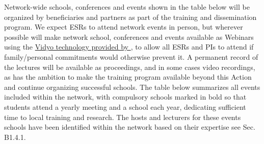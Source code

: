 
Network-wide schools, conferences and events shown in the table below will be organized by \acronym beneficiaries and partners as part of the training and dissemination program. 
We expect ESRs to attend network events in person, but wherever possible will make network school, conferences and events available as Webinars using the \href{http://information-technology.web.cern.ch/services/fe/vidyo}{Vidyo technology provided by \cernentity}, to allow all \acronym ESRs and PIs to attend if family/personal commitments would otherwise prevent it. 
A permanent record of the lectures will be available as proceedings, and in some cases video recordings, as \acronym has the ambition to make the training program available beyond this Action and continue organizing successful schools. 
The table below summarizes all events included within the network, with compulsory schools marked in bold so that students attend a yearly meeting and a school each year, dedicating sufficient time to local training and research. 
The hosts and lecturers for these events schools have been identified within the network based on their expertise see Sec. B1.4.1. 

